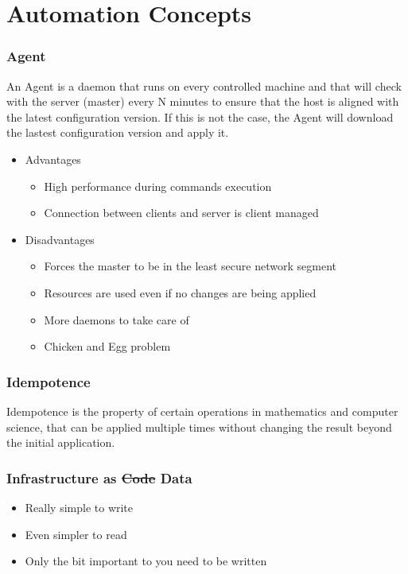 \documentclass[t,aspectratio=169]{beamer}
\begin{document}
\section{Automation Concepts}
\begin{frame}
    \frametitle{Agent}
    An Agent is a daemon that runs on every controlled machine and that will check with the server (master) every N minutes to ensure that the host is aligned with the latest configuration version. If this is not the case, the Agent will download the lastest configuration version and apply it.
    \begin{itemize}
        \item<2-> Advantages
        \begin{itemize}
            \item<3-> High performance during commands execution
            \item<4-> Connection between clients and server is client managed
        \end{itemize}
        \item<5-> Disadvantages
        \begin{itemize}
            \item<6-> Forces the master to be in the least secure network segment
            \item<7-> Resources are used even if no changes are being applied
            \item<8-> More daemons to take care of
            \item<9-> Chicken and Egg problem
        \end{itemize}
    \end{itemize}
\end{frame}

\begin{frame}
    \frametitle{Idempotence}
    \begin{definition}{Idempotence}
    is the property of certain operations in mathematics and computer science, that can be applied multiple times without changing the result beyond the initial application. 
    \end{definition}
\end{frame}

\begin{frame}
    \frametitle{Infrastructure as \sout{Code} Data}
    \begin{itemize}
        \item<2-> Really simple to write
        \item<3-> Even simpler to read
        \item<4-> Only the bit important to you need to be written
    \end{itemize}
\end{frame}
\end{document}
